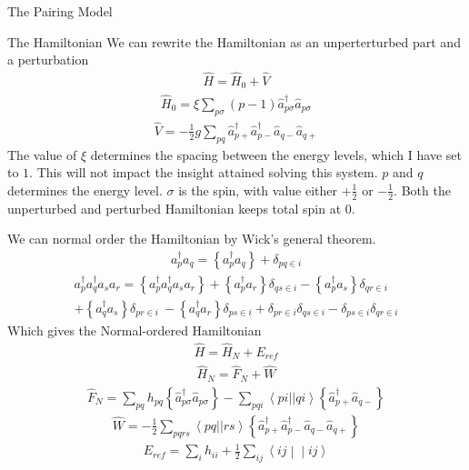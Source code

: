 \documentclass[twoside,english]{uiofysmaster}
\begin{document}
\begin{chapter}{The Pairing Model}
\begin{section}{The Hamiltonian}
		We can rewrite the Hamiltonian as an unperterturbed part and a perturbation
		\begin{align}
			\hat H = \hat H_0 + \hat V
		\end{align}
		\begin{align}
			\hat H_0 = \xi \sum_{p \sigma} (p-1) \hat a_{p \sigma}^{\dagger} \hat a_{p \sigma}
		\end{align}
		\begin{align}
			\hat V = - \frac{1}{2}g \sum_{pq} \hat a_{p +}^{\dagger} \hat a_{p-}^{\dagger} \hat a_{q-} \hat a_{q+}
		\end{align}
		The value of $\xi$ determines the spacing between the energy levels, which I have set to $1$. This will not impact the insight attained solving this system. $p$ and $q$ determines the energy level. $\sigma$ is the spin, with value either $+\frac{1}{2}$ or $-\frac{1}{2}$. Both the unperturbed and perturbed Hamiltonian keeps total spin at $0$.

		We can normal order the Hamiltonian by Wick's general theorem. 
		\begin{align}
			a_p^{\dagger} a_q = \left\{ a_p^{\dagger}a_q \right\} + \delta_{pq \in i}
		\end{align}
		\begin{align}
			a_p^{\dagger} a_q^{\dagger} a_s a_r = \left\{ a_p^{\dagger}a_q^{\dagger} a_s a_r \right\} +\left\{a_p^{\dagger}a_r\right\} \delta_{qs\in i} - \left\{a_p^{\dagger}a_s\right\} \delta_{qr\in i} \\
			+\left\{a_q^{\dagger}a_s\right\} \delta_{pr\in i} \
			- \left\{a_q^{\dagger}a_r\right\} \delta_{ps\in i} + \delta_{pr \in i} \delta_{qs \in i} - \delta_{ps \in i}\delta_{qr \in i}
		\end{align}
		Which gives the Normal-ordered Hamiltonian
		\begin{align}
			\hat H = \hat H_N + E_{ref}
		\end{align}
		\begin{align}
			\hat H_N = \hat F_N + \hat W 
		\end{align}
		\begin{align}
			\hat F_N =  \sum_{pq} h_{pq} \left\{ \hat a_{p \sigma}^{\dagger} \hat a_{p \sigma} \right\}
			- \sum_{pqi} \left< pi || qi \right> \left\{ \hat a_{p +}^{\dagger} \hat a_{q -} \right\}
		\end{align}
		\begin{align}
			\hat W = - \frac{1}{2} \sum_{pqrs} \left< pq || rs \right> \left\{ \hat a_{p +}^{\dagger} \hat a_{p-}^{\dagger} \hat a_{q-} \hat a_{q+} \right\}
		\end{align}
		\begin{align}
 			E_{ref} = \sum_{i} h_{ii} + \frac{1}{2} \sum_{ij} \left< ij \middle| \middle| ij \right>
		\end{align}


\end{section}
\end{chapter}
\end{document}
